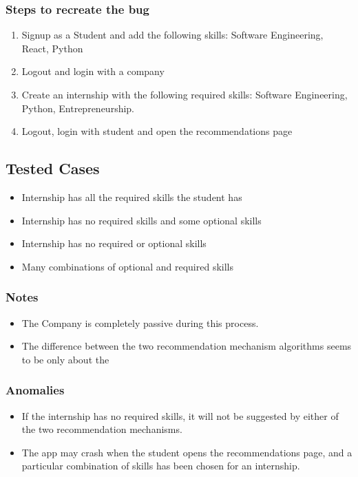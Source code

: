 \subsubsection*{Steps to recreate the bug}
\begin{enumerate}
    \item Signup as a Student and add the following skills: Software Engineering, React, Python
    \item Logout and login with a company
    \item Create an internship with the following required skills: Software Engineering, Python, Entrepreneurship.
    \item Logout, login with student and open the recommendations page
\end{enumerate}
\subsection*{Tested Cases}
\begin{itemize}
    \item Internship has all the required skills the student has
    \item Internship has no required skills and some optional skills
    \item Internship has no required or optional skills
    \item Many combinations of optional and required skills 
\end{itemize}
\subsubsection*{Notes}
\begin{itemize}
    \item The Company is completely passive during this process.
    \item The difference between the two recommendation mechanism algorithms seems to be only about the 
\end{itemize}
\subsubsection*{Anomalies}
\begin{itemize}
    \item If the internship has no required skills, it will not be suggested by either of the two recommendation mechanisms.
    \item The app may crash when the student opens the recommendations page, and a particular combination of skills has been chosen for an internship.
\end{itemize}

